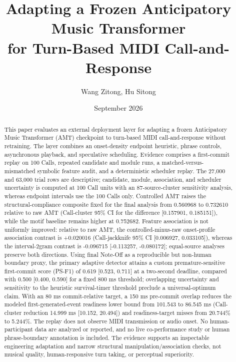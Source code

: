 \documentclass[11pt,a4paper]{article}
\title{Adapting a Frozen Anticipatory Music Transformer\\for Turn-Based MIDI Call-and-Response}
\author{Wang Zitong, Hu Sitong}
\date{September 2026}
\begin{document}
\maketitle

\begin{abstract}
This paper evaluates an external deployment layer for adapting a frozen Anticipatory Music Transformer (AMT) checkpoint to turn-based MIDI call-and-response without retraining. The layer combines an onset-density endpoint heuristic, phrase controls, asynchronous playback, and speculative scheduling. Evidence comprises a first-commit replay on 100 Calls, repeated candidate and module runs, a matched-versus-mismatched symbolic feature audit, and a deterministic scheduler replay. The 27,000 and 63,000 trial rows are descriptive; candidate, module, association, and scheduler uncertainty is computed at 100 Call units with an 87-source-cluster sensitivity analysis, whereas endpoint intervals use the 100 Calls only. Controlled AMT raises the structural-compliance composite fixed for the final analysis from 0.560968 to 0.732610 relative to raw AMT (Call-cluster 95\% CI for the difference [0.157901, 0.185151]), while the motif baseline remains higher at 0.752682. Feature association is not uniformly improved: relative to raw AMT, the controlled-minus-raw onset-profile association contrast is +0.020016 (Call-jackknife 95\% CI [0.006927, 0.033105]), whereas the interval-2gram contrast is -0.096715 [-0.113257, -0.080172]; equal-source analyses preserve both directions. Using final Note-Off as a reproducible but non-human boundary proxy, the primary adaptive detector attains a custom premature-sensitive first-commit score (PS-F1) of 0.619 [0.523, 0.711] at a two-second deadline, compared with 0.500 [0.400, 0.590] for a fixed 800 ms threshold; overlapping uncertainty and sensitivity to the heuristic survival-timer threshold preclude a universal-optimum claim. With an 80 ms commit-relative target, a 150 ms pre-commit overlap reduces the modeled first-generated-event readiness lower bound from 101.543 to 86.545 ms (Call-cluster reduction 14.999 ms [10.152, 20.494]) and readiness-target misses from 20.744\% to 5.244\%. The replay does not observe MIDI transmission or audio onset. No human-participant data are analyzed or reported, and no live co-performance study or human phrase-boundary annotation is included. The evidence supports an inspectable engineering adaptation and narrow structural manipulation/association checks, not musical quality, human-responsive turn taking, or perceptual superiority.
\end{abstract}
\end{document}
